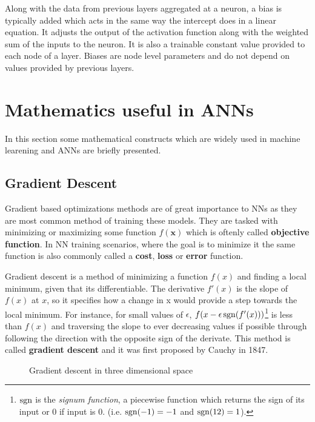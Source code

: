 Along with the data from previous layers aggregated at a neuron, a bias
is typically added which acts in the same way the intercept does in a
linear equation. It adjusts the output of the activation function along
with the weighted sum of the inputs to the neuron. It is also a trainable
constant value provided to each node of a layer. Biases are node level
parameters and do not depend on values provided by previous layers.


\section{Mathematics useful in ANNs}

In this section some mathematical constructs which are widely
used in machine learening and ANNs are briefly presented.

\subsection{Gradient Descent}\label{sec:gradient_descent}

Gradient based optimizations methods are of great importance to
NNs as they are most common method of training these models. They
are tasked with minimizing or maximizing some function $f(\bm{x})$ which
is oftenly called \textbf{objective function}. In NN training
scenarios, where the goal is to minimize it the same function is also
commonly called a \textbf{cost}, \textbf{loss} or \textbf{error}
function\cite{book:Goodfellow}.

Gradient descent is a method of minimizing a function $f(x)$ and
finding a local minimum, given that its differentiable. The
derivative $f'(x)$ is the slope of $f(x)$ at $x$, so it specifies
how a change in x would provide a step towards the local minimum. For instance,
for small values of $\epsilon$, $f(x - \epsilon \operatorname{sgn} (f'(x)))$\footnote{
  $\operatorname{sgn}$ is the \textit{signum function}, a piecewise function which returns
  the sign of its input or 0 if input is 0. (i.e. $\operatorname{sgn}(-1) = -1$ and $\operatorname{sgn}(12) = 1$).
} is less than $f(x)$ and traversing the slope to ever decreasing
values if possible through following the direction with the opposite
sign of the derivate. This method is called \textbf{gradient descent}
and it was first proposed by Cauchy \cite{article:Cauchy} in 1847.
\begin{figure}[h!]
  \centering
  
  \caption{Gradient descent in three dimensional space}
  \label{fig:gradient_descent_2d}
\end{figure}

